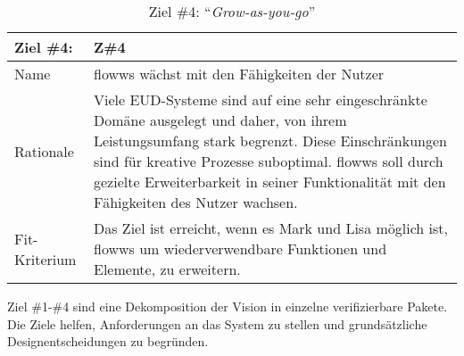\begin{table}[H]
\caption{Ziel \#4: "`\textit{Grow-as-you-go}"'}
\label{tab:ziel4}
\begin{tabularx}{\textwidth}{lX}
\hline
\rowcolor[HTML]{EFEFEF} 
Ziel \#4:     & Z\#4 \\ \hline
Name          & flowws wächst mit den Fähigkeiten der Nutzer \\ \hline
Rationale     & Viele \ac{EUD}-Systeme sind auf eine sehr eingeschränkte Domäne ausgelegt und daher, von ihrem Leistungsumfang stark begrenzt. Diese Einschränkungen sind für kreative Prozesse suboptimal. flowws soll durch gezielte Erweiterbarkeit in seiner Funktionalität mit den Fähigkeiten des Nutzer wachsen. \\ \hline
Fit-Kriterium & Das Ziel ist erreicht, wenn es Mark und Lisa möglich ist, flowws um wiederverwendbare Funktionen und Elemente, zu erweitern.  \\ \hline
\end{tabularx}
\end{table}

Ziel \#1-\#4 sind eine Dekomposition der Vision in einzelne verifizierbare Pakete. Die Ziele helfen, Anforderungen an das System zu stellen und grundsätzliche Designentscheidungen zu begründen.

